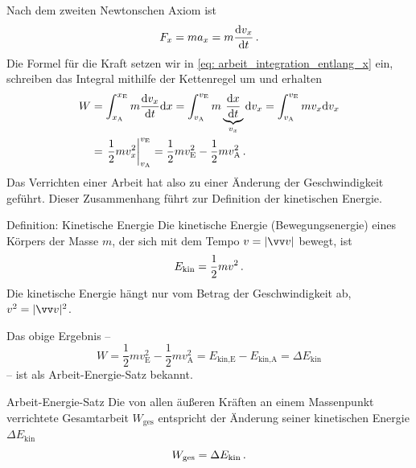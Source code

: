 Nach dem zweiten Newtonschen Axiom ist 
\begin{equation}
    F_x = m a_x = m \frac{\mathrm{d} v_x}{\mathrm{d} t} \,.
\end{equation}
Die Formel für die Kraft setzen wir in \cref{eq: arbeit_integration_entlang_x} ein, schreiben das Integral mithilfe der Kettenregel um und erhalten
\begin{align*}
    W &= \int_{x_\text{A}}^{x_\text{E}} m \frac{\mathrm{d} v_x}{\mathrm{d} t} \mathrm{d} x 
      = \int_{v_\text{A}}^{v_\text{E}} m \underbrace{\frac{\mathrm{d} x}{\mathrm{d} t}}_{v_x} \mathrm{d} v_x 
      = \int_{v_\text{A}}^{v_\text{E}} m v_x \mathrm{d} v_x \\
      &= \left. \frac{1}{2} m v_x^2 \right|_{v_\text{A}}^{v_\text{E}} 
      = \frac{1}{2} m v_\text{E}^2 - \frac{1}{2} m v_\text{A}^2 \,.
\end{align*}
Das Verrichten einer Arbeit hat also zu einer Änderung der Geschwindigkeit geführt. Dieser Zusammenhang führt zur Definition der kinetischen Energie.

\begin{importantbox}[]{Definition: Kinetische Energie}
    Die kinetische Energie (Bewegungsenergie) eines Körpers der Masse $m$, der sich mit dem Tempo $v = |\ivec{v}|$ bewegt, ist
    \begin{equation}\label{eq: kinetische_energie}
        E_{\text{kin}} = \frac{1}{2}mv^2 \,.
    \end{equation}
    Die kinetische Energie hängt nur vom Betrag der Geschwindigkeit ab, $v^2 = |\ivec{v}|^2$. 
\end{importantbox}
Das obige Ergebnis -- 
\begin{equation}
    W = \frac{1}{2} m v_\text{E}^2 - \frac{1}{2} m v_\text{A}^2 = E_{\text{kin,E}} - E_{\text{kin,A}} = \Delta E_{\text{kin}}    
\end{equation}
-- ist als Arbeit-Energie-Satz bekannt.

\begin{rememberbox}[]{Arbeit-Energie-Satz}
    Die von allen äußeren Kräften an einem Massenpunkt verrichtete Gesamtarbeit $W_{\text{ges}}$ entspricht der Änderung seiner kinetischen Energie $\Delta E_{\text{kin}}$
    \begin{equation}\label{eq: arbeit_energie_satz}
        W_{\text{ges}} = \Delta E_{\text{kin}}\,.
    \end{equation}
\end{rememberbox}

